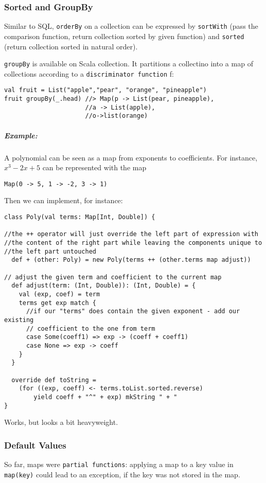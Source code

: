 \documentclass{scrartcl}
\newcommand{\example}{\subparagraph{Example:}} %
\newcommand{\term}[1]{\verb~#1~} %
\begin{document}
\subsubsection{Sorted and GroupBy}
\label{sec:SortedAndGroupby}
Similar to SQL, \lstinline|orderBy| on a collection can be expressed by
\lstinline|sortWith| (pass the comparison function, return collection sorted by
given function) and \lstinline|sorted| (return collection sorted in natural
order). 

\lstinline|groupBy| is available on Scala collection. It partitions a collectino
into a map of collections according to a \term{discriminator function} f:
\begin{lstlisting}
val fruit = List("apple","pear", "orange", "pineapple")
fruit groupBy(_.head) //> Map(p -> List(pear, pineapple), 
                      //a -> List(apple),
                      //o->list(orange) 
\end{lstlisting}

\example A polynomial can be seen as a map from exponents to coefficients. For
instance, $x^3 - 2x + 5$ can be represented with the map
\begin{lstlisting}
Map(0 -> 5, 1 -> -2, 3 -> 1)
\end{lstlisting}
Then we can implement, for instance:
\begin{lstlisting}
class Poly(val terms: Map[Int, Double]) {
  
//the ++ operator will just override the left part of expression with 
//the content of the right part while leaving the components unique to 
//the left part untouched
  def + (other: Poly) = new Poly(terms ++ (other.terms map adjust))

// adjust the given term and coefficient to the current map
  def adjust(term: (Int, Double)): (Int, Double) = {
    val (exp, coef) = term
    terms get exp match {
      //if our "terms" does contain the given exponent - add our existing 
      // coefficient to the one from term
      case Some(coeff1) => exp -> (coeff + coeff1)
      case None => exp -> coeff
    }
  }

  override def toString = 
    (for ((exp, coeff) <- terms.toList.sorted.reverse) 
        yield coeff + "^" + exp) mkString " + "
}
\end{lstlisting}
Works, but looks a bit heavyweight. 

\subsubsection{Default Values}
\label{sec:DefaultValues}
So far, maps were \term{partial functions}: applying a map to a key value in
\lstinline|map(key)| could lead to an exception, if the key was not stored in the
map.
\end{document}
